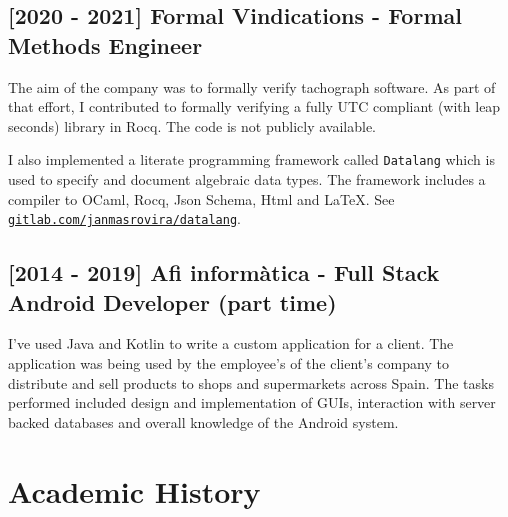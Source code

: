 \documentclass[11pt]{article}
\begin{document}
\subsection*{[2020 - 2021] Formal Vindications - Formal Methods Engineer}
The aim of the company was to formally verify tachograph software. As part of
that effort, I contributed to formally verifying a fully UTC compliant (with
leap seconds) library in Rocq. The code is not publicly available.

I also implemented a literate programming framework called \texttt{Datalang}
which is used to specify and document algebraic data types. The framework
includes a compiler to OCaml, Rocq, Json Schema, Html and LaTeX. See
\href{https://gitlab.com/janmasrovira/datalang}{\texttt{gitlab.com/janmasrovira/datalang}}.

\subsection*{[2014 - 2019] Afi informàtica - Full Stack Android Developer (part time)}
I've used Java and Kotlin to write a custom application for a client. The
application was being used by the employee's of the client's company to
distribute and sell products to shops and supermarkets across Spain. The tasks
performed included design and implementation of GUIs, interaction with server
backed databases and overall knowledge of the Android system.

\section{Academic History}
\end{document}

